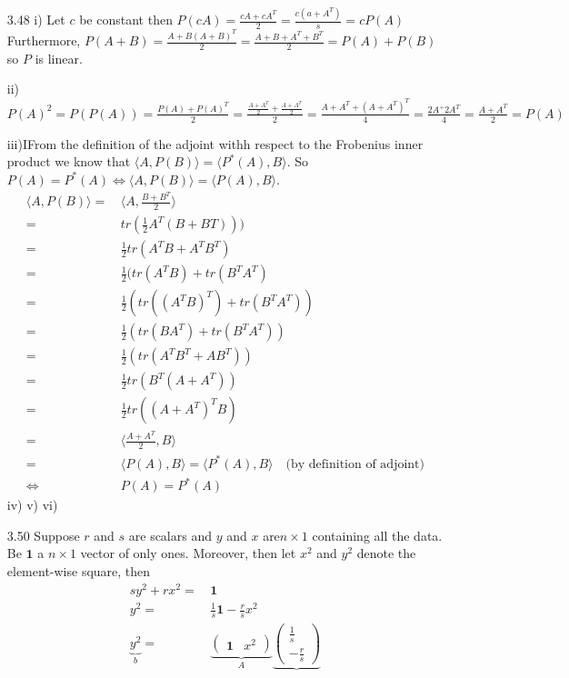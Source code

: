 \documentclass[letterpaper,12pt]{article}
\theoremstyle{definition}
\begin{document}
\begin{enumerate}
\item[3.48]
i) Let $c$ be constant then $P(cA) = \frac{cA + cA^T}{2} = \frac{c(a+A^T)}{s} = cP(A)$
Furthermore, $P(A+B) = \frac{A+B(A+B)^T}{2} = \frac{A+B+A^T+B^T}{2} = P(A) + P(B)$  so $P$ is linear.

ii)$P(A)^2  = P(P(A)) = \frac{P(A)+P(A)^T}{2} =\frac{\frac{A+A^T}{2}+\frac{A+A^T}{2}}{2}  = \frac{A+A^T + (A+A^T)^T}{4}= \frac{2A^+2A^T}{4} =\frac{A+A^T}{2} = P(A) $

iii)IFrom the definition of the adjoint withh respect to the Frobenius inner product we know that $\langle A, P(B) \rangle = \langle P^*(A), B \rangle $. So $P(A) = P^*(A) \iff \langle A, P(B) \rangle = \langle P(A), B \rangle$.
\begin{align*}
\langle A, P(B) \rangle  =&\, \langle A, \frac{B+B^T}{2} \rangle \\
=&\, tr(\frac{1}{2}A^T(B+BT)))\\
=&\, \frac{1}{2}tr(A^TB+A^TB^T) \\
= &\, \frac{1}{2} (tr(A^TB) +tr(B^TA^T
)\\
=&\, \frac{1}{2}(tr((A^TB)^T)+tr(B^TA^T))\\
=&\, \frac{1}{2}(tr(BA^T)+tr(B^TA^T))\\
=&\, \frac{1}{2}(tr(A^TB^T+AB^T))\\
=&\,\frac{1}{2} tr(B^T(A+A^T))\\
=&\, \frac{1}{2} tr((A+A^T)^TB)\\
=&\, \langle  \frac{A+A^T}{2},B \rangle\\
=&\, \langle P(A) , B \rangle =  \langle P^*(A), B \rangle \quad \text{(by definition of adjoint)}\\
\Leftrightarrow &\, P(A) = P^*(A)
\end{align*}
iv)
v)
vi)
\item[3.50] Suppose $r$ and $s$ are scalars and $y$ and $x$ are$n\times 1 $ containing all the data. Be $\mathbf{1}$ a $ n\times 1$ vector of only ones. Moreover, then let $x^2$ and $y^2$ denote the element-wise square, then 
\begin{align*}
 sy^2+rx^2=&\, \mathbf{1}\\
 y^2 =&\,  \frac{1}{s}\mathbf{1} -\frac{r}{s}x^2\\
 \underbrace{y^2}_b =&\, \underbrace{\begin{pmatrix}
\mathbf{1}& x^2
\end{pmatrix}}_A
\underbrace{\begin{pmatrix}
\frac{1}{s} \\ -\frac{r}{s}

\end{pmatrix}}
\end{align*}
\end{enumerate}
\end{document}
